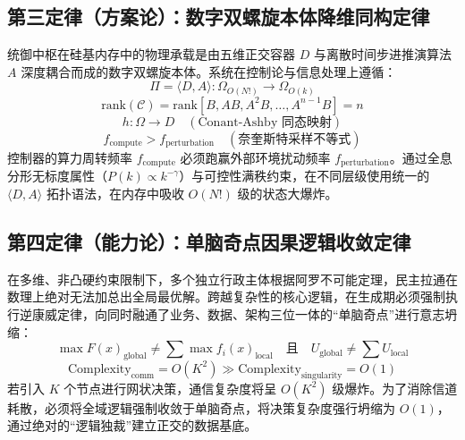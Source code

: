 \documentclass[11pt,a4paper]{article}
\begin{document}
\subsection*{第三定律（方案论）：数字双螺旋本体降维同构定律}
统御中枢在硅基内存中的物理承载是由五维正交容器 $D$ 与离散时间步进推演算法 $A$ 深度耦合而成的数字双螺旋本体。系统在控制论与信息处理上遵循：
\begin{equation}
    \Pi = \langle D, A \rangle : \Omega_{O(N!)} \longrightarrow \Omega_{O(k)}
\end{equation}
\begin{equation}\label{controllability}
    \text{rank}(\mathcal{C}) = \text{rank}\left[ B, AB, A^2B, \dots, A^{n-1}B \right] = n
\end{equation}
\begin{equation}
    h: \Omega \longrightarrow D \quad (\text{Conant-Ashby 同态映射})
\end{equation}
\begin{equation}\label{sampling}
    f_{\text{compute}} > f_{\text{perturbation}} \quad (\text{奈奎斯特采样不等式})
\end{equation}
控制器的算力周转频率 $f_{\text{compute}}$ 必须跑赢外部环境扰动频率 $f_{\text{perturbation}}$。通过全息分形无标度属性（$P(k) \propto k^{-\gamma}$）与可控性满秩约束，在不同层级使用统一的 $\langle D,A \rangle$ 拓扑语法，在内存中吸收 $O(N!)$ 级的状态大爆炸。

\subsection*{第四定律（能力论）：单脑奇点因果逻辑收敛定律}
在多维、非凸硬约束限制下，多个独立行政主体根据阿罗不可能定理，民主拉通在数理上绝对无法加总出全局最优解。跨越复杂性的核心逻辑，在生成期必须强制执行逆康威定律，向同时融通了业务、数据、架构三位一体的“单脑奇点”进行意志坍缩：
\begin{equation}
    \max F(x)_{\text{global}} \neq \sum \max f_i(x)_{\text{local}} \quad \text{且} \quad U_{\text{global}} \neq \sum U_{\text{local}}
\end{equation}
\begin{equation}
    \text{Complexity}_{\text{comm}} = O(K^2) \gg \text{Complexity}_{\text{singularity}} = O(1)
\end{equation}
若引入 $K$ 个节点进行网状决策，通信复杂度将呈 $O(K^2)$ 级爆炸。为了消除信道耗散，必须将全域逻辑强制收敛于单脑奇点，将决策复杂度强行坍缩为 $O(1)$，通过绝对的“逻辑独裁”建立正交的数据基底。
\end{document}
